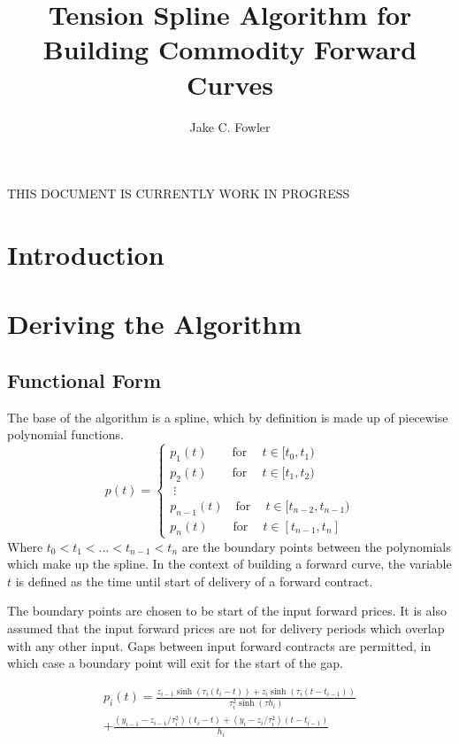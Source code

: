 \documentclass{article}
\title{Tension Spline Algorithm for Building Commodity Forward Curves}
\author{Jake C. Fowler}
\date{}
\begin{document}
\newcommand{\+}[1]{\ensuremath{\mathbf{#1}}}

\maketitle

THIS DOCUMENT IS CURRENTLY WORK IN PROGRESS

\section{Introduction}

\section{Deriving the Algorithm}
\subsection{Functional Form}
The base of the algorithm is a spline, which by definition is made up of piecewise polynomial functions.
\begin{equation}
p(t) = 
\begin{cases}
    p_1(t)\qquad \text{for}\ \quad t \in [t_0, t_1) \\
    p_2(t)\qquad \text{for}\ \quad t \in [t_1, t_2) \\
    \;\vdots \\
    p_{n-1}(t)\quad \text{for}\ \quad t \in [t_{n-2}, t_{n-1}) \\
    p_n(t)\qquad \text{for}\ \quad t \in [t_{n-1}, t_n]
\end{cases}
\end{equation}
Where $t_0 < t_1 < \hdots < t_{n-1} < t_{n}$ are the boundary points between the polynomials which make up the spline.
In the context of building a forward curve, the variable $t$ is defined as
the time until start of delivery of a forward contract.

\bigskip

The boundary points are chosen to be start of the input forward prices. It is also
assumed that the input forward prices are not for delivery periods which overlap
with any other input. Gaps between input forward contracts are permitted, in which
case a boundary point will exit for the start of the gap.

\bigskip

\begin{multline}
p_i(t) = \frac{z_{i-1} \sinh(\tau_i (t_i - t)) + z_i \sinh(\tau_i (t - t_{i-1}))}{\tau_i^2 \sinh(\tau h_i)}  \\
    + \frac{(y_{i-1} - z_{i-1}/\tau_i^2)(t_i - t) + (y_i - z_i/\tau_i^2)(t - t_{i-1})}{h_i}
\end{multline}
\end{document}
